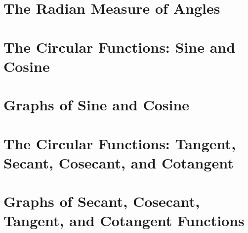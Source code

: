 \section{The Radian Measure of Angles}



\newpage

\section{The Circular Functions: Sine and Cosine}



\newpage

\section{Graphs of Sine and Cosine}



\newpage

\section{The Circular Functions: Tangent, Secant, Cosecant, and Cotangent}



\newpage
\section{Graphs of Secant, Cosecant, Tangent, and Cotangent Functions}



\newpage

